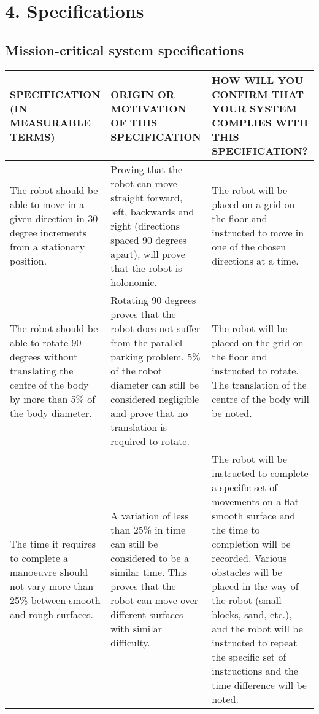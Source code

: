 
\section*{4. Specifications}

\subsection*{Mission-critical system specifications}

\begin{center}
\begin{longtable}{|p{5cm}|p{5cm}|p{5cm}|}
\hline
  \textbf{SPECIFICATION (IN MEASURABLE TERMS)} &
  \textbf{ORIGIN OR MOTIVATION OF THIS SPECIFICATION} &
  \textbf{HOW WILL YOU CONFIRM THAT YOUR SYSTEM COMPLIES WITH
           THIS SPECIFICATION?}\\
\hline The robot should be able to move in a given direction in 30 degree increments from a stationary position.
   & Proving that the robot can move straight forward, left, backwards and right (directions spaced 90 degrees apart), will prove that the robot is holonomic.
   &The robot will be placed on a grid on the floor and instructed to move in one of the chosen directions at a time.
   \\
\hline The robot should be able to rotate 90 degrees without translating the centre of the body by more than 5\% of the body diameter.
   & Rotating 90 degrees proves that the robot does not suffer from the parallel parking problem. 5\% of the robot diameter can still be considered negligible and prove that no translation is required to rotate.
   & The robot will be placed on the grid on the floor and instructed to rotate. The translation of the centre of the body will be noted.
   \\
\hline The time it requires to complete a manoeuvre should not vary more than 25\% between smooth and rough surfaces.
   & A variation of less than 25\% in time can still be considered to be a similar time. This proves that the robot can move over different surfaces with similar difficulty.
   &The robot will be instructed to complete a specific set of movements on a flat smooth surface and the time to completion will be recorded. Various obstacles will be placed in the way of the robot (small blocks, sand, etc.), and the robot will be instructed to repeat the specific set of instructions and the time difference will be noted.

\end{longtable}
\end{center}
